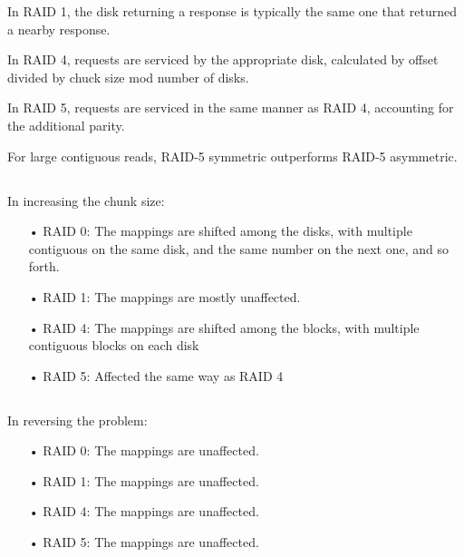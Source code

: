 \documentclass[]{scrartcl}
\begin{document}
In RAID 1, the disk returning a response is typically the same one that returned a nearby response.

In RAID 4, requests are serviced by the appropriate disk, calculated by offset divided by chuck size mod number of disks.

In RAID 5, requests are serviced in the same manner as RAID 4, accounting for the additional parity.

For large contiguous reads, RAID-5 symmetric outperforms RAID-5 asymmetric.

\subsection{}
In increasing the chunk size:
\begin{itemize}
\item[•] RAID 0: The mappings are shifted among the disks, with multiple contiguous on the same disk, and the same number on the next one, and so forth.
\item[•] RAID 1: The mappings are mostly unaffected.
\item[•] RAID 4: The mappings are shifted among the blocks, with multiple contiguous blocks on each disk
\item[•] RAID 5: Affected the same way as RAID 4
\end{itemize}

\subsection{}
In reversing the problem:
\begin{itemize}
\item[•] RAID 0: The mappings are unaffected.
\item[•] RAID 1: The mappings are unaffected.
\item[•] RAID 4: The mappings are unaffected.
\item[•] RAID 5: The mappings are unaffected.
\end{itemize}
\end{document}
